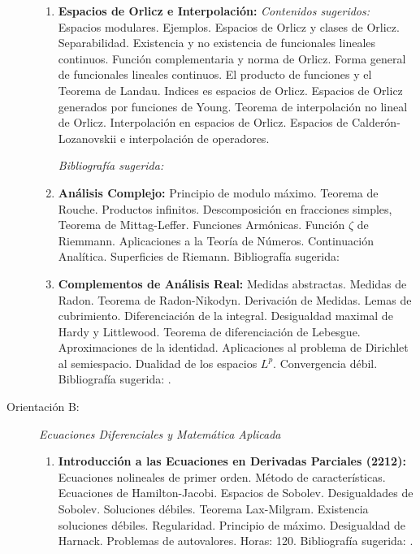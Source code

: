 \documentclass[a4paper, 12pt]{article}
\begin{document}
\begin{description}
\begin{enumerate}
\item\textbf{Espacios de Orlicz e Interpolación:} 
\emph{Contenidos sugeridos:} Espacios modulares. Ejemplos. Espacios de Orlicz y clases de Orlicz. Separabilidad. Existencia y no existencia de funcionales lineales continuos. Función complementaria y norma de Orlicz. Forma general de funcionales lineales continuos. El producto de funciones y el Teorema de Landau. Indices es espacios de Orlicz. Espacios de Orlicz generados por funciones de Young. Teorema de interpolación no lineal de Orlicz. Interpolación en espacios de Orlicz. Espacios de Calderón-Lozanovskii e interpolación de operadores.

\noindent \textit{Bibliografía sugerida: } \cite{ Harjulehto,Krbec,KR,J. Lang,M.M. Rao}





\item \textbf{Análisis Complejo:} Principio de modulo máximo. Teorema de
Rouche. Productos infinitos. Descomposición en fracciones simples,
Teorema de Mittag-Leffer. Funciones Armónicas. Función $\zeta$ de
Riemmann. Aplicaciones a la Teoría de Números. Continuación
Analítica. Superficies de Riemann. Bibliografía sugerida:
\cite{ahlfors,conway}

\item\textbf{Complementos de Análisis Real:} Medidas abstractas. Medidas de
Radon. Teorema de Radon-Nikodyn. Derivación de Medidas. Lemas de
cubrimiento. Diferenciación de la integral. Desigualdad maximal de
Hardy y Littlewood. Teorema de diferenciación de Lebesgue.
Aproximaciones de la identidad. Aplicaciones al problema de
Dirichlet al semiespacio. Dualidad de los espacios $L^p$.
Convergencia débil. Biblio\-grafía sugerida:
\cite{evansgariepy,favazo,rudin}.


\end{enumerate}

\item[Orientación B:] \emph{Ecuaciones Diferenciales y Matemática Aplicada}
\begin{enumerate}


\item\textbf{ Introducción a las Ecuaciones en Derivadas Parciales (2212):} Ecuaciones nolineales
de primer orden. Método de características. Ecuaciones de
Hamilton-Jacobi. Espacios de Sobolev. Desigualdades de Sobolev. Soluciones débiles. Teorema Lax-Milgram. Existencia soluciones débiles.  
Regularidad. Principio de máximo. Desigualdad de Harnack. Problemas de autovalores.  Horas: 120. Bibliografía sugerida: \cite{evans}.





\end{enumerate}
\end{description}
\end{document}
